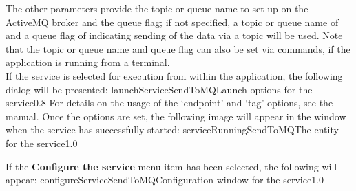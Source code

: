 The other parameters provide the topic or queue name to set up on the ActiveMQ broker and
the queue flag; if not specified, a topic or queue name of  and a queue flag
of  \longDash{} indicating sending of the data via a topic \longDash{} will be
used.
Note that the topic or queue name and queue flag can also be set via commands, if the
application is running from a terminal.\\

\insertStandardServiceCommands
\secondaryEnd
\condPage
{}
If the service is selected for execution from within the \emph{\MMMU} application, the
following dialog will be presented:
%
{launchServiceSendToMQ}{Launch options for the \emph{\SMO} service}{0.8}
\condPage{}
For details on the usage of the `endpoint' and `tag' options, see the \emph{\MMMU} manual.
Once the options are set, the following image will appear in the \emph{\MMMU} window when
the service has successfully started:
%
{serviceRunningSendToMQ}{The \emph{\MMMU} entity for the \emph{\SMO} service}{1.0}

If the \textbf{Configure the service} menu item has been selected, the following will
appear:
%
{configureServiceSendToMQ}{Configuration window for the \emph{\SMO} service}{1.0}
\secondaryEnd
\primaryEnd{}
